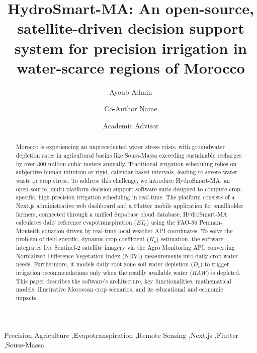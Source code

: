 \documentclass[3p,twocolumn]{elsarticle}
\begin{document}
\begin{frontmatter}

\title{HydroSmart-MA: An open-source, satellite-driven decision support system for precision irrigation in water-scarce regions of Morocco}

\author[aff1]{Ayoub Admin}

\author[aff1]{Co-Author Name}
\author[aff1]{Academic Advisor}

\address[aff1]{Department of Precision Agriculture and Digital Development, Souss-Massa University, Agadir, Morocco}

\begin{abstract}
Morocco is experiencing an unprecedented water stress crisis, with groundwater depletion rates in agricultural basins like Souss-Massa exceeding sustainable recharges by over 300 million cubic meters annually. Traditional irrigation scheduling relies on subjective human intuition or rigid, calendar-based intervals, leading to severe water waste or crop stress. To address this challenge, we introduce HydroSmart-MA, an open-source, multi-platform decision support software suite designed to compute crop-specific, high-precision irrigation scheduling in real-time. The platform consists of a Next.js administrative web dashboard and a Flutter mobile application for smallholder farmers, connected through a unified Supabase cloud database. HydroSmart-MA calculates daily reference evapotranspiration ($ET_0$) using the FAO-56 Penman-Monteith equation driven by real-time local weather API coordinates. To solve the problem of field-specific, dynamic crop coefficient ($K_c$) estimation, the software integrates live Sentinel-2 satellite imagery via the Agro Monitoring API, converting Normalized Difference Vegetation Index (NDVI) measurements into daily crop water needs. Furthermore, it models daily root zone soil water depletion ($D_r$) to trigger irrigation recommendations only when the readily available water ($RAW$) is depleted. This paper describes the software's architecture, key functionalities, mathematical models, illustrative Moroccan crop scenarios, and its educational and economic impacts.
\end{abstract}

\begin{keyword}
Precision Agriculture \sep Evapotranspiration \sep Remote Sensing \sep Next.js \sep Flutter \sep Souss-Massa
\end{keyword}

\end{frontmatter}
\end{document}
